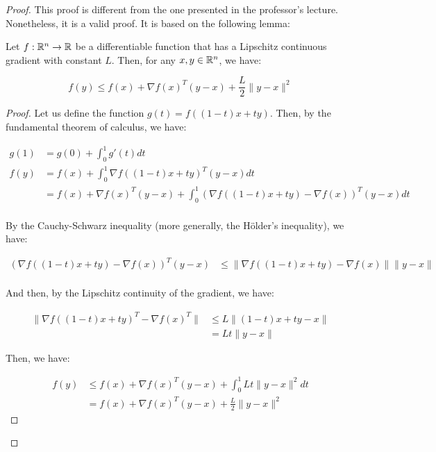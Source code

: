 \begin{proof}
    This proof is different from the one presented in the professor's lecture. Nonetheless, it
    is a valid proof. It is based on the following lemma:

    \begin{lemma}
        Let $f: \mathbb{R}^n \rightarrow \mathbb{R}$ be a differentiable function that has a Lipschitz
        continuous gradient with constant $L$. Then, for any $x, y \in \mathbb{R}^n$, we have:

        \begin{equation}
            f(y) \leq f(x) + \nabla f(x)^T (y - x) + \frac{L}{2} \| y - x \|^2
        \end{equation}
    \end{lemma}

    \begin{proof}
        Let us define the function $g(t) = f((1 - t) x + t y)$. Then, by the fundamental theorem
        of calculus, we have:
        
        \begin{align*}
            g(1) &= g(0) + \int_{0}^{1} g'(t) dt\\
            f(y)&= f(x) + \int_{0}^{1} \nabla f((1 - t) x + t y)^T (y - x) dt\\
                &= f(x) + \nabla f(x)^T (y - x) + \int_{0}^{1} (\nabla f((1 - t) x + t y) - \nabla f(x))^T (y - x) dt\\
        \end{align*}

        By the Cauchy-Schwarz inequality (more generally, the Hölder's inequality), we have:

        \begin{align*}
            (\nabla f((1 - t) x + t y) - \nabla f(x))^T(y - x) &\leq \| \nabla f((1 - t) x + t y) - \nabla f(x) \| \| y - x \|\\
        \end{align*}

        And then, by the Lipschitz continuity of the gradient, we have:

        \begin{align*}
            \|\nabla f((1 - t) x + t y)^T - \nabla f(x)^T\| &\leq L \| (1 - t) x + t y - x \|\\
            &= L t \| y - x \|
        \end{align*}

        Then, we have:

        \begin{align*}
            f(y) &\leq f(x) + \nabla f(x)^T (y - x) + \int_{0}^{1} L t \| y - x \|^2 dt\\
            &= f(x) + \nabla f(x)^T (y - x) + \frac{L}{2} \| y - x \|^2
        \end{align*}


\end{proof}
\end{proof}
